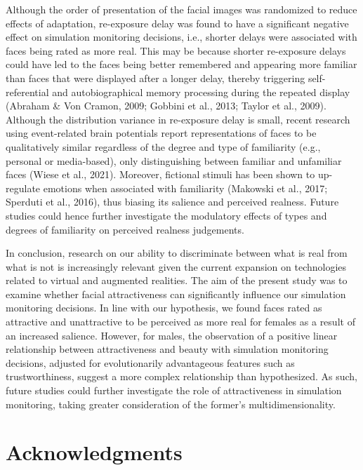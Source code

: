 \documentclass[
  man,floatsintext]{apa6}
\begin{document}
Although the order of presentation of the facial images was randomized to reduce effects of adaptation, re-exposure delay was found to have a significant negative effect on simulation monitoring decisions, i.e., shorter delays were associated with faces being rated as more real. This may be because shorter re-exposure delays could have led to the faces being better remembered and appearing more familiar than faces that were displayed after a longer delay, thereby triggering self-referential and autobiographical memory processing during the repeated display (Abraham \& Von Cramon, 2009; Gobbini et al., 2013; Taylor et al., 2009). Although the distribution variance in re-exposure delay is small, recent research using event-related brain potentials report representations of faces to be qualitatively similar regardless of the degree and type of familiarity (e.g., personal or media-based), only distinguishing between familiar and unfamiliar faces (Wiese et al., 2021). Moreover, fictional stimuli has been shown to up-regulate emotions when associated with familiarity (Makowski et al., 2017; Sperduti et al., 2016), thus biasing its salience and perceived realness. Future studies could hence further investigate the modulatory effects of types and degrees of familiarity on perceived realness judgements.

In conclusion, research on our ability to discriminate between what is real from what is not is increasingly relevant given the current expansion on technologies related to virtual and augmented realities. The aim of the present study was to examine whether facial attractiveness can significantly influence our simulation monitoring decisions. In line with our hypothesis, we found faces rated as attractive and unattractive to be perceived as more real for females as a result of an increased salience. However, for males, the observation of a positive linear relationship between attractiveness and beauty with simulation monitoring decisions, adjusted for evolutionarily advantageous features such as trustworthiness, suggest a more complex relationship than hypothesized. As such, future studies could further investigate the role of attractiveness in simulation monitoring, taking greater consideration of the former's multidimensionality.

\hypertarget{acknowledgments}{%
\section{Acknowledgments}\label{acknowledgments}}
\end{document}
